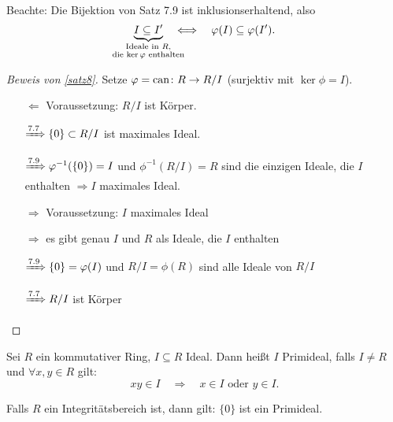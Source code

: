 \documentclass[12pt,a4paper]{scrartcl}
\begin{document}
\begin{bem} Beachte: Die Bijektion von Satz 7.9 ist inklusionserhaltend, also 
	\[
	\underbrace{I \subseteq I'}_{\mathclap{\substack{\text{Ideale in $R$,}\\\text{die $\ker\phi$ enthalten}}}} \quad \Longleftrightarrow \quad \phi(I) \subseteq \phi(I').
	\]
\end{bem}

\begin{proof}[Beweis von \cref{satz8}] %
	Setze $\phi = \can\colon R\to R/I$ (surjektiv mit $\ker\phi = I$).
	\begin{itemize}
		\item [\glqq $\Leftarrow$\grqq ] Voraussetzung: $R/I$ ist Körper.
		
		$\xRightarrow{7.7}\{0\}\subset R/I$ ist maximales Ideal.
		
		$\xRightarrow{7.9}\phi^{-1}(\{0\}) = I$ und $\phi^{-1}(R/I) = R$ sind die einzigen Ideale, die $I$ enthalten $\Rightarrow I $ maximales Ideal.
		
		\item[\glqq$\Rightarrow$\grqq] Voraussetzung: $I$ maximales Ideal
		
		$\Rightarrow$ es gibt genau $I$ und $R$ als Ideale, die $I$ enthalten
		
		$\xRightarrow{7.9}\{0\} = \phi(I)$ und $R/I = \phi(R)$ sind alle Ideale von $R/I$
		
		$\xRightarrow{7.7}R/I$ ist Körper
	\end{itemize}
\end{proof}

\begin{defi}
	Sei $R$ ein kommutativer Ring, $I\subseteq R$ Ideal. Dann heißt $I$ Primideal, falls $I\neq R$ und $\forall x, y\in R$ gilt: \[xy\in I \quad \Longrightarrow \quad x\in I\text{ oder }y\in I.\]
\end{defi}
\begin{bem}
	Falls $R$ ein Integritätsbereich ist, dann gilt: $\{0\}$ ist ein Primideal.
\end{bem}
\end{document}
